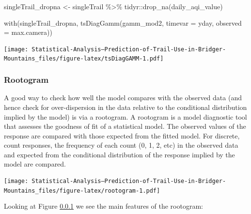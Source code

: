 \documentclass[
]{book}
\newenvironment{Shaded}{\begin{snugshade}}{\end{snugshade}}
\newcommand{\AttributeTok}[1]{\textcolor[rgb]{0.77,0.63,0.00}{#1}}
\newcommand{\FunctionTok}[1]{\textcolor[rgb]{0.00,0.00,0.00}{#1}}
\newcommand{\NormalTok}[1]{#1}
\newcommand{\OtherTok}[1]{\textcolor[rgb]{0.56,0.35,0.01}{#1}}
\newcommand{\SpecialCharTok}[1]{\textcolor[rgb]{0.00,0.00,0.00}{#1}}
\newcommand{\StringTok}[1]{\textcolor[rgb]{0.31,0.60,0.02}{#1}}
\begin{document}
\begin{Shaded}
\begin{Highlighting}[]
\NormalTok{singleTrail\_dropna }\OtherTok{\textless{}{-}}\NormalTok{ singleTrail }\SpecialCharTok{\%\textgreater{}\%} 
\NormalTok{  tidyr}\SpecialCharTok{::}\FunctionTok{drop\_na}\NormalTok{(}\StringTok{\textquotesingle{}daily\_aqi\_value\textquotesingle{}}\NormalTok{)}

\FunctionTok{with}\NormalTok{(singleTrail\_dropna, }
     \FunctionTok{tsDiagGamm}\NormalTok{(gamm\_mod2, }
                \AttributeTok{timevar =}\NormalTok{ yday,}
                \AttributeTok{observed =}\NormalTok{ max.camera))}
\end{Highlighting}
\end{Shaded}

\texttt{[image: Statistical-Analysis--Prediction-of-Trail-Use-in-Bridger-Mountains\_files/figure-latex/tsDiagGAMM-1.pdf]}

\hypertarget{rootogram}{%
\subsubsection{Rootogram}\label{rootogram}}

A good way to check how well the model compares with the observed data (and hence check for over-dispersion in the data relative to the conditional distribution implied by the model) is via a rootogram. A rootogram is a model diagnostic tool that assesses the goodness of fit of a statistical model. The observed values of the response are compared with those expected from the fitted model. For discrete, count responses, the frequency of each count (0, 1, 2, etc) in the observed data and expected from the conditional distribution of the response implied by the model are compared.

\begin{Shaded}
\end{Shaded}

\texttt{[image: Statistical-Analysis--Prediction-of-Trail-Use-in-Bridger-Mountains\_files/figure-latex/rootogram-1.pdf]}

Looking at Figure \ref{rootogram} we see the main features of the rootogram:
\end{document}
